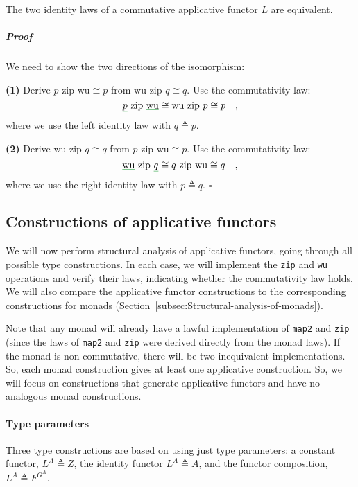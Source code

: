 The two identity laws of a commutative applicative functor $L$ are
equivalent.

\subparagraph{Proof}

We need to show the two directions of the isomorphism: 

\textbf{(1)} Derive $p\,\,\text{zip}\,\,\text{wu}\cong p$ from $\text{wu}\,\,\text{zip}\,\,q\cong q$.
Use the commutativity law:
\[
\gunderline p\,\,\text{zip}\,\,\gunderline{\text{wu}}\cong\text{wu}\,\,\text{zip}\,\,p\cong p\quad,
\]
where we use the left identity law with $q\triangleq p$.

\textbf{(2)} Derive $\text{wu}\,\,\text{zip}\,\,q\cong q$ from $p\,\,\text{zip}\,\,\text{wu}\cong p$.
Use the commutativity law:
\[
\gunderline{\text{wu}}\,\,\text{zip}\,\,\gunderline q\cong q\,\,\text{zip}\,\,\text{wu}\cong q\quad,
\]
where we use the right identity law with $p\triangleq q$. $\square$

\subsection{Constructions of applicative functors\label{subsec:Constructions-of-applicative-functors}}

We will now perform structural analysis of applicative functors, going
through all possible type constructions. In each case, we will implement
the \lstinline!zip! and \lstinline!wu! operations and verify their
laws, indicating whether the commutativity law holds. We will also
compare the applicative functor constructions to the corresponding
constructions for monads (Section~\ref{subsec:Structural-analysis-of-monads}).

Note that any monad will already have a lawful implementation of \lstinline!map2!
and \lstinline!zip! (since the laws of \lstinline!map2! and \lstinline!zip!
were derived directly from the monad laws). If the monad is non-commutative,
there will be two inequivalent implementations. So, each monad construction
gives at least one applicative construction. So, we will focus on
constructions that generate applicative functors and have no analogous
monad constructions.

\paragraph{Type parameters}

Three type constructions are based on using just type parameters:
a constant functor, $L^{A}\triangleq Z$, the identity functor $L^{A}\triangleq A$,
and the functor composition, $L^{A}\triangleq F^{G^{A}}$.

